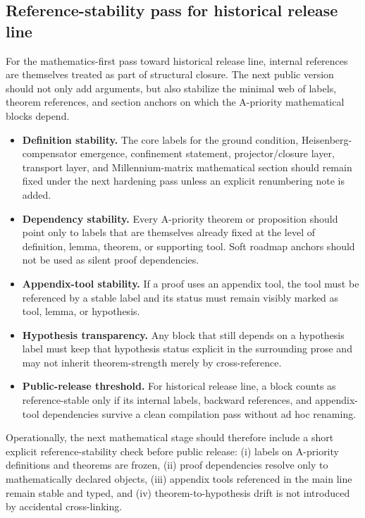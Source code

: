 \documentclass[12pt,a4paper]{article}
\DeclareRobustCommand{\QSCver}[1]{archival stage}
\renewcommand{\QSCver}[1]{historical release line}
\begin{document}
\subsection*{Reference-stability pass for \QSCver{v2.27.0}}

For the mathematics-first pass toward \QSCver{v2.27.0}, internal references are themselves treated as part of structural closure. The next public version should not only add arguments, but also stabilize the minimal web of labels, theorem references, and section anchors on which the A-priority mathematical blocks depend.

\begin{itemize}
 \item \textbf{Definition stability.} The core labels for the ground condition, Heisenberg-compensator emergence, confinement statement, projector/closure layer, transport layer, and Millennium-matrix mathematical section should remain fixed under the next hardening pass unless an explicit renumbering note is added.
 \item \textbf{Dependency stability.} Every A-priority theorem or proposition should point only to labels that are themselves already fixed at the level of definition, lemma, theorem, or supporting tool. Soft roadmap anchors should not be used as silent proof dependencies.
 \item \textbf{Appendix-tool stability.} If a proof uses an appendix tool, the tool must be referenced by a stable label and its status must remain visibly marked as tool, lemma, or hypothesis.
 \item \textbf{Hypothesis transparency.} Any block that still depends on a hypothesis label must keep that hypothesis status explicit in the surrounding prose and may not inherit theorem-strength merely by cross-reference.
 \item \textbf{Public-release threshold.} For \QSCver{v2.27.0}, a block counts as reference-stable only if its internal labels, backward references, and appendix-tool dependencies survive a clean compilation pass without ad hoc renaming.
\end{itemize}

Operationally, the next mathematical stage should therefore include a short explicit reference-stability check before public release: (i) labels on A-priority definitions and theorems are frozen, (ii) proof dependencies resolve only to mathematically declared objects, (iii) appendix tools referenced in the main line remain stable and typed, and (iv) theorem-to-hypothesis drift is not introduced by accidental cross-linking.
\end{document}
